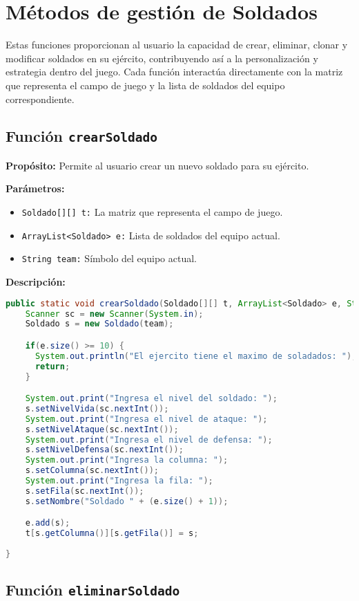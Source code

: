 \section{Métodos de gestión de Soldados}
Estas funciones proporcionan al usuario la capacidad de crear, eliminar, clonar y modificar soldados en su ejército, contribuyendo así a la personalización y estrategia dentro del juego. Cada función interactúa directamente con la matriz que representa el campo de juego y la lista de soldados del equipo correspondiente.

\subsection{Función \texttt{crearSoldado}}

\textbf{Propósito:} Permite al usuario crear un nuevo soldado para su ejército.

\textbf{Parámetros:}
\begin{itemize}
  \item \texttt{Soldado[][] t:} La matriz que representa el campo de juego.
  \item \texttt{ArrayList<Soldado> e:} Lista de soldados del equipo actual.
  \item \texttt{String team:} Símbolo del equipo actual.
\end{itemize}

\textbf{Descripción:}
\begin{lstlisting}[language=java]
public static void crearSoldado(Soldado[][] t, ArrayList<Soldado> e, String team) {
    Scanner sc = new Scanner(System.in);
    Soldado s = new Soldado(team);

    if(e.size() >= 10) {
      System.out.println("El ejercito tiene el maximo de soladados: ");
      return;
    }

    System.out.print("Ingresa el nivel del soldado: ");
    s.setNivelVida(sc.nextInt());
    System.out.print("Ingresa el nivel de ataque: ");
    s.setNivelAtaque(sc.nextInt());
    System.out.print("Ingresa el nivel de defensa: ");
    s.setNivelDefensa(sc.nextInt());
    System.out.print("Ingresa la columna: ");
    s.setColumna(sc.nextInt());
    System.out.print("Ingresa la fila: ");
    s.setFila(sc.nextInt());
    s.setNombre("Soldado " + (e.size() + 1));

    e.add(s);
    t[s.getColumna()][s.getFila()] = s;
 
}
\end{lstlisting}

\subsection{Función \texttt{eliminarSoldado}}

